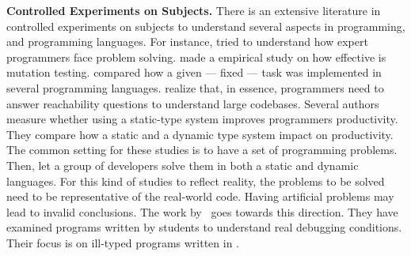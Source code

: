 \textbf{Controlled Experiments on Subjects.}
There is an extensive literature \perse{} in controlled experiments on subjects to understand several aspects in programming, and programming languages.
For instance, \cite{solowayEmpiricalStudiesProgramming1984} tried to understand how expert programmers face problem solving.
\cite{buddTheoreticalEmpiricalStudies1980} made a empirical study on how effective is mutation testing.
\cite{precheltEmpiricalComparisonSeven2000} compared how a given --- fixed --- task was implemented in several programming languages.
\cite{latozaDevelopersAskReachability2010} realize that, in essence, programmers need to answer reachability questions to understand large codebases.
Several authors~\cite{stuchlikStaticVsDynamic2011,mayerEmpiricalStudyInfluence2012,harlinImpactUsingStaticType2017} measure whether using a static-type system improves programmers productivity.
They compare how a static and a dynamic type system impact on productivity.
The common setting for these studies is to have a set of programming problems.
Then, let a group of developers solve them in both a static and dynamic languages.
For this kind of studies to reflect reality, the problems to be solved need to be representative of the real-world code.
Having artificial problems may lead to invalid conclusions.
The work by~\cite{wuHowTypeErrors2017,wuLearningUserFriendly2017} goes towards this direction. 
They have examined programs written by students to understand real debugging conditions. 
Their focus is on ill-typed programs written in \haskell{}.
